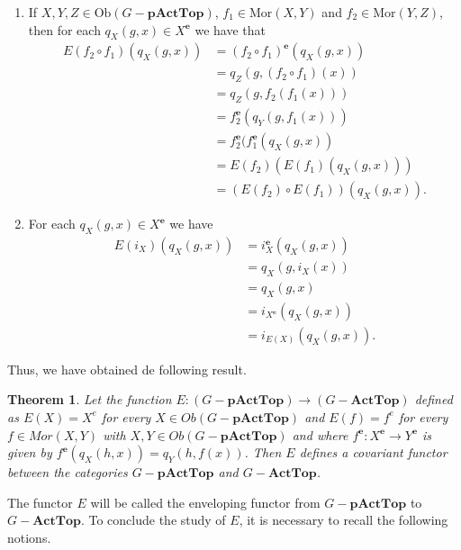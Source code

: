 \documentclass[sn-mathphys-num]{sn-jnl}%
\theoremstyle{thmstyleone}%
\newtheorem{theorem}{Theorem}%
\theoremstyle{thmstyletwo}%
\theoremstyle{thmstylethree}%
\begin{document}
\begin{enumerate}
\begin{enumerate}
\begin{align*}
&=\beta^\mathbf{e}(g,q_Y(h,f(x))\\
&=\beta^\mathbf{e}(g,f^\mathbf{e}(q_X(h,x))).
\end{align*}
\end{enumerate}
Consequently, $f^\mathbf{e}$  is an element of $\text{Mor}(X^\mathbf{e},Y^\mathbf{e})$.
\item  If $X,Y,Z\in \text{Ob}(G-\mathbf{pActTop})$, $f_1\in\text{Mor}(X,Y)$ and $f_2\in\text{Mor}(Y,Z)$, then for each $q_X(g,x)\in X^\mathbf{e}$ we have that
\begin{equation*}
\begin{split}
E(f_2\circ f_1)(q_X(g,x))&=(f_2\circ f_1)^\mathbf{e}(q_X(g,x))\\
&=q_Z(g,(f_2\circ f_1)(x))\\
&=q_Z(g,f_2(f_1(x)))\\
&=f_2^\mathbf{e}(q_Y(g,f_1(x)))\\
&=f_2^\mathbf{e}(f_1^\mathbf{e}(q_X(g,x))\\
&=E(f_2)(E(f_1)(q_X(g,x)))\\
&=(E(f_2)\circ E(f_1))(q_X(g,x)).
\end{split}
\end{equation*}
\item  For each $q_X(g,x)\in X^\mathbf{e}$ we have
\begin{align*}
E(i_{X})(q_X(g,x))
&=i_{X}^\mathbf{e}(q_X(g,x))\\
&=q_X(g,i_{X}(x))\\
&=q_X(g,x)\\
&=i_{X^\mathbf{e}}(q_X(g,x))\\
&=i_{E(X)}(q_X(g,x)).
\end{align*}
\end{enumerate}

Thus, we have obtained de following result.\\

\begin{theorem}
Let the function $E:(G-\mathbf{pActTop})\to (G-\mathbf{ActTop})$ defined as $E(X)=X^e$ for every $X\in Ob(G-\mathbf{pActTop})$ and $E(f)=f^e$ for every $f\in Mor(X,Y)$ with $X,Y\in Ob(G-\mathbf{pActTop})$ and where   $f^\mathbf{e}:X^\mathbf{e}\to Y^\mathbf{e}$ is given by $f^\mathbf{e}(q_X(h,x))=q_Y(h,f(x))$. Then $E$ defines a covariant functor between the categories $G-\mathbf{pActTop}$ and $G-\mathbf{ActTop}$. \\
\end{theorem}


The functor $E$ will be called the enveloping functor from $G-\mathbf{pActTop}$ to $G-\mathbf{ActTop}$. To conclude the study of $E$, it is necessary to recall the following notions.\\
\end{document}
